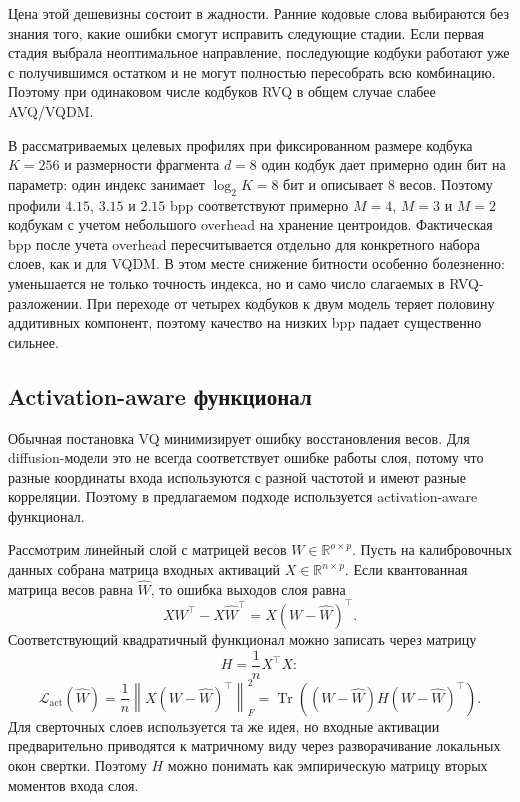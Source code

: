 \documentclass[a4paper,12pt]{article}
\begin{document}
Цена этой дешевизны состоит в жадности. Ранние кодовые слова выбираются без знания того, какие ошибки смогут исправить следующие стадии. Если первая стадия выбрала неоптимальное направление, последующие кодбуки работают уже с получившимся остатком и не могут полностью пересобрать всю комбинацию. Поэтому при одинаковом числе кодбуков RVQ в общем случае слабее AVQ/VQDM.

В рассматриваемых целевых профилях при фиксированном размере кодбука $K=256$ и размерности фрагмента $d=8$ один кодбук дает примерно один бит на параметр: один индекс занимает $\log_2 K = 8$ бит и описывает $8$ весов. Поэтому профили $4.15$, $3.15$ и $2.15$ bpp соответствуют примерно $M=4$, $M=3$ и $M=2$ кодбукам с учетом небольшого overhead на хранение центроидов. Фактическая bpp после учета overhead пересчитывается отдельно для конкретного набора слоев, как и для VQDM. В этом месте снижение битности особенно болезненно: уменьшается не только точность индекса, но и само число слагаемых в RVQ-разложении. При переходе от четырех кодбуков к двум модель теряет половину аддитивных компонент, поэтому качество на низких bpp падает существенно сильнее.

\subsection{Activation-aware функционал}

Обычная постановка VQ минимизирует ошибку восстановления весов. Для diffusion-модели это не всегда соответствует ошибке работы слоя, потому что разные координаты входа используются с разной частотой и имеют разные корреляции. Поэтому в предлагаемом подходе используется activation-aware функционал.

Рассмотрим линейный слой с матрицей весов $W \in \mathbb{R}^{o \times p}$. Пусть на калибровочных данных собрана матрица входных активаций $X \in \mathbb{R}^{n \times p}$. Если квантованная матрица весов равна $\hat W$, то ошибка выходов слоя равна
\[
    X W^\top - X \hat W^\top
    =
    X (W-\hat W)^\top.
\]
Соответствующий квадратичный функционал можно записать через матрицу
\[
    H = \frac{1}{n} X^\top X:
\]
\[
    \mathcal{L}_{\mathrm{act}}(\hat W)
    =
    \frac{1}{n}
    \left\|
        X (W-\hat W)^\top
    \right\|_F^2
    =
    \operatorname{Tr}
    \left(
        (W-\hat W) H (W-\hat W)^\top
    \right).
\]
Для сверточных слоев используется та же идея, но входные активации предварительно приводятся к матричному виду через разворачивание локальных окон свертки. Поэтому $H$ можно понимать как эмпирическую матрицу вторых моментов входа слоя.
\end{document}
